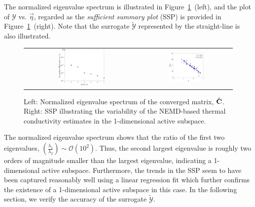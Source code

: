 The normalized eigenvalue spectrum is illustrated
in Figure~\ref{fig:casfig2}~(left), and the plot of $\mathcal{Y}$ vs. $\vec\eta$, regarded as the \textit{sufficient
summary plot} (SSP) is provided in Figure~\ref{fig:casfig2}~(right). Note that the surrogate $\tilde{\mathcal{Y}}$
represented by the straight-line is also illustrated.
%
\begin{figure}[htbp]
\begin{center}
\begin{tabular}{cc}
  \includegraphics[width=0.42\textwidth]{./Figures/eig_spec}
  &
  \hspace{3mm}
  \includegraphics[width=0.4\textwidth]{./Figures/free_ssp1D}
  \end{tabular}
\caption{Left: Normalized eigenvalue spectrum of the converged matrix, $\hat{\mathbf{{C}}}$. Right: SSP
illustrating the variability of the NEMD-based thermal conductivity estimates in the 1-dimensional
active subspace.}
\label{fig:casfig2}
\end{center}
\end{figure}
%
The normalized eigenvalue spectrum
shows that the ratio of the first two eigenvalues, $\left(\frac{\lambda_1}{\lambda_2}\right)\sim\mathcal{O}(10^2)$.
Thus, the second largest eigenvalue is roughly two orders of magnitude smaller than the largest eigenvalue,
indicating a 1-dimensional active subspace. Furthermore, the trends in the SSP seem to have been captured
reasonably well using a linear regression fit which further confirms the existence of a 1-dimensional active
subspace in this case. In the following section, we verify the accuracy of the
surrogate $\tilde{\mathcal{Y}}$. 


